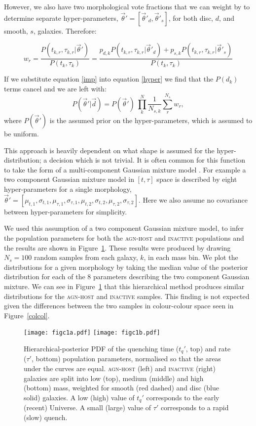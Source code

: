 \documentclass[useAMS,usenatbib]{mn2e}
\begin{document}
{However, we also have two morphological vote fractions that we can weight by to determine separate hyper-parameters, $\vec{\theta}' = [\vec{\theta}'_d, \vec{\theta}'_s]$, for both disc, $d$, and smooth, $s$, galaxies. Therefore:

\begin{equation}\label{morphimp}
w_r = \frac{P(t_{k,r}, \tau_{k,r}|\vec{\theta}')}{P(t_k, \tau_k)} =  \frac{p_{d,k} P(t_{k,r}, \tau_{k,r}|\vec{\theta}'_d) + p_{s,k} P(t_{k,r}, \tau_{k,r}|\vec{\theta}'_s)}{P(t_k, \tau_k)}
\end{equation} 

If we substitute equation \ref{imp} into equation \ref{hyper} we find that the $P(d_k)$ terms cancel and we are left with:
\begin{equation}
P(\vec{\theta}'|\vec{d}) = P(\vec{\theta}')~\prod_k^N \frac{1}{N_{s,k}} \sum_r^{N_s} w_r ,
\end{equation}
where $P(\vec{\theta}')$ is the assumed prior on the hyper-parameters, which is assumed to be uniform.

This approach is heavily dependent on what shape is assumed for the hyper-distribution; a decision which is not trivial. It is often common for this function to take the form of a multi-component Gaussian mixture model \citep{MacKay, Lahav00}. For example a two component Gaussian mixture model in $[t, \tau]$ space is described by eight hyper-parameters for a single morphology, $\vec{\theta}' = [\mu_{t,1}, \sigma_{t,1}, \mu_{\tau,1}, \sigma_{\tau,1}, \mu_{t,2}, \sigma_{t,2}, \mu_{\tau,2}, \sigma_{\tau,2}]$. Here we also assume no covariance between hyper-parameters for simplicity. 

We used this assumption of a two component Gaussian mixture model, to infer the population parameters for both the \textsc{agn-host} and \textsc{inactive} populations and the results are shown in Figure~\ref{method3}. These results were produced by drawing $N_s = 100$ random samples from each galaxy, $k$, in each mass bin. We plot the distributions for a given morphology by taking the median value of the posterior distribution for each of the 8 parameters describing the two component Gaussian mixture. We can see in Figure~\ref{method3} that this hierarchical method produces similar distributions for the \textsc{agn-host} and \textsc{inactive} samples. This finding is not expected given the differences between the two samples in colour-colour space seen in Figure~\ref{colcol}. 

\begin{figure}
\texttt{[image: figc1a.pdf]}
\texttt{[image: figc1b.pdf]}
\caption[8pt]{Hierarchical-posterior PDF of the quenching time ($t_q'$, top) and rate ($\tau'$, bottom) population parameters, normalised so that the areas under the curves are equal. \textsc{agn-host} (left) and \textsc{inactive} (right) galaxies are split into low (top), medium (middle) and high (bottom) mass, weighted for smooth (red dashed) and disc (blue solid) galaxies. A low (high) value of $t_q'$ corresponds to the early (recent) Universe. A small (large) value of $\tau'$ corresponds to a rapid (slow) quench.}
\label{method3}
\end{figure}

}
\end{document}
